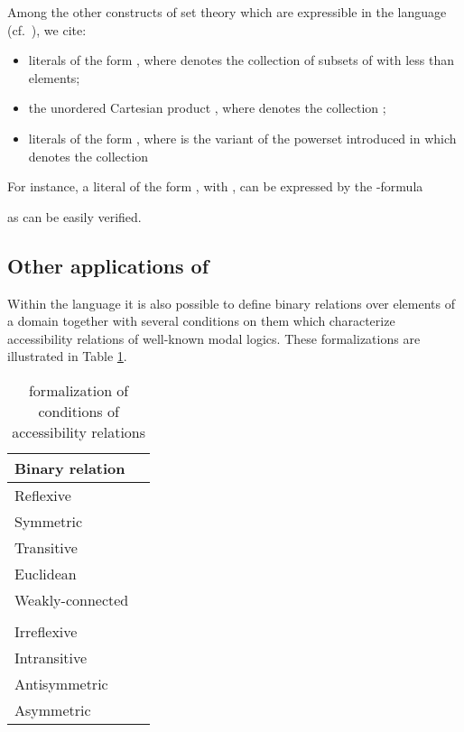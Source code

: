 \documentclass{fundam}
\begin{document}
Among the other constructs of set theory which are expressible in the
language  (cf.\ \cite{CanNic08}), we cite:
\begin{itemize}

\item literals of the form , where  denotes the collection of subsets of  with less than 
elements;

\item the unordered Cartesian product , where  denotes the collection ;

\item literals of the form , where
 is the variant of the powerset
introduced in \cite{Can91} which denotes the collection

\end{itemize}
For instance, a literal of the form , with , can be expressed by the -formula

as can be easily verified.

\subsection{Other applications of }
Within the  language it is also possible to define binary
relations over elements of a domain together with several conditions
on them which characterize accessibility relations of well-known modal
logics.  These formalizations are illustrated in Table
\ref{tab:accesrel}.


\begin{table}[tb]
\begin{tabular}{|l|l|}
  \hline
Binary relation & \\\hline\hline
  Reflexive & \\\hline
  Symmetric & \\\hline
  Transitive & \\\hline
  Euclidean  &  \\ \hline
  Weakly-connected &   \\
                   & \hfill \\ \hline
  Irreflexive & \\ \hline
  Intransitive & \\\hline
  Antisymmetric & \\\hline
  Asymmetric & \\
  \hline
\end{tabular}
\caption{\label{tab:accesrel}  formalization of conditions of accessibility relations}
\end{table}
\end{document}

